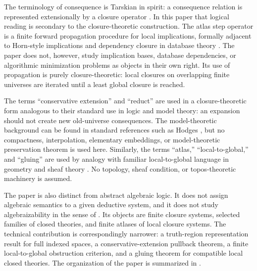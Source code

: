 \documentclass[11pt]{amsart}
\numberwithin{equation}{section}
\theoremstyle{plain}
\theoremstyle{definition}
\theoremstyle{remark}
\begin{document}
The terminology of consequence is Tarskian in spirit: a consequence relation is represented extensionally by a closure operator \cite{Tarski1956,Wojcicki1988}.  In this paper that logical reading is secondary to the closure-theoretic construction.  The atlas step operator is a finite forward propagation procedure for local implications, formally adjacent to Horn-style implications and dependency closure in database theory \cite{Fagin1982,Maier1983}.  The paper does not, however, study implication bases, database dependencies, or algorithmic minimization problems as objects in their own right.  Its use of propagation is purely closure-theoretic: local closures on overlapping finite universes are iterated until a least global closure is reached.

The terms ``conservative extension'' and ``reduct'' are used in a closure-theoretic form analogous to their standard use in logic and model theory: an expansion should not create new old-universe consequences.  The model-theoretic background can be found in standard references such as Hodges \cite{Hodges1993}, but no compactness, interpolation, elementary embeddings, or model-theoretic preservation theorem is used here.  Similarly, the terms ``atlas,'' ``local-to-global,'' and ``gluing'' are used by analogy with familiar local-to-global language in geometry and sheaf theory \cite{MacLaneMoerdijk1992}.  No topology, sheaf condition, or topos-theoretic machinery is assumed.

The paper is also distinct from abstract algebraic logic.  It does not assign algebraic semantics to a given deductive system, and it does not study algebraizability in the sense of \cite{BlokPigozzi1989,FontJansana1996}.  Its objects are finite closure systems, selected families of closed theories, and finite atlases of local closure systems.  The technical contribution is correspondingly narrower: a truth-region representation result for full indexed spaces, a conservative-extension pullback theorem, a finite local-to-global obstruction criterion, and a gluing theorem for compatible local closed theories.  The organization of the paper is summarized in .
\end{document}

